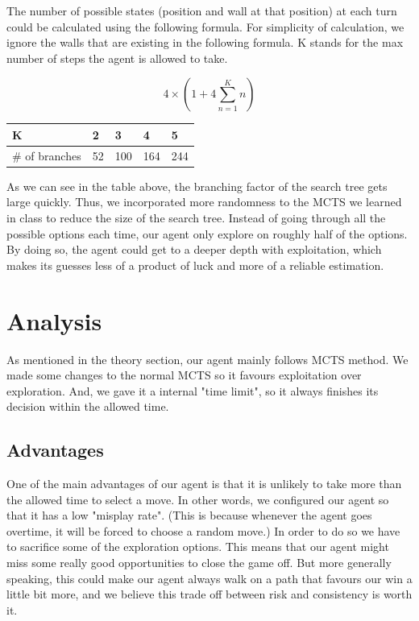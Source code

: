 \documentclass[twoside,11pt]{article}
\begin{document}
The number of possible states (position and wall at that position) at each turn could be calculated using the following formula.
For simplicity of calculation, we ignore the walls that are existing in the following formula.
K stands for the max number of steps the agent is allowed to take.

\begin{equation}
	4\times\left(1 + 4\sum_{n=1}^{K}{n}\right)
\end{equation}

\begin{table}[!ht]
	\centering
	\begin{tabular}{|l|l|l|l|l|}
		\hline
		K & 2 & 3 & 4 & 5  \\ \hline
		\# of branches & 52 & 100 & 164 & 244  \\ \hline
	\end{tabular}
\end{table}

As we can see in the table above, the branching factor of the search tree gets large quickly.
Thus, we incorporated more randomness to the MCTS we learned in class to reduce the size of the search tree. 
Instead of going through all the possible options each time, our agent only explore on roughly half of the options. 
By doing so, the agent could get to a deeper depth with exploitation, which makes its guesses less of a product of luck and more of a reliable estimation.

\section{Analysis}
As mentioned in the theory section, our agent mainly follows MCTS method. 
We made some changes to the normal MCTS so it favours exploitation over exploration. 
And, we gave it a internal "time limit", so it always finishes its decision within the allowed time.

\subsection{Advantages}
One of the main advantages of our agent is that it is unlikely to take more than the allowed time to select a move. 
In other words, we configured our agent so that it has a low "misplay rate".
(This is because whenever the agent goes overtime, it will be forced to choose a random move.)
In order to do so we have to sacrifice some of the exploration options. 
This means that our agent might miss some really good opportunities to close the game off. 
But more generally speaking, this could make our agent always walk on a path that favours our win a little bit more, and we believe this trade off between risk and consistency is worth it.
\end{document}
